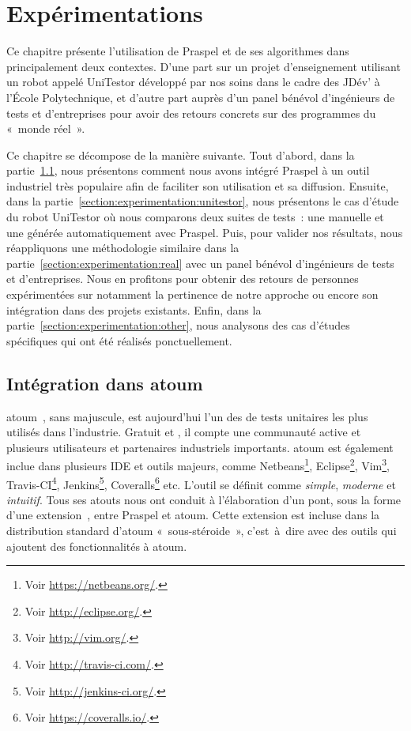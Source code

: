 \chapter{Expérimentations}
\label{chapter:experimentations}

\minitoc


Ce chapitre présente l'utilisation de Praspel et de ses algorithmes dans
principalement deux contextes. D'une part sur un projet d'enseignement utilisant
un robot appelé UniTestor développé par nos soins dans le cadre des JDév' à
l'École Polytechnique, et d'autre part auprès d'un panel bénévol d'ingénieurs de
tests et d'entreprises pour avoir des retours concrets sur des programmes du
«~monde réel~».

Ce chapitre se décompose de la manière suivante. Tout d'abord, dans la
partie~\ref{section:experimentation:atoum}, nous présentons comment nous avons
intégré Praspel à un outil industriel très populaire afin de faciliter son
utilisation et sa diffusion. Ensuite, dans la
partie~\ref{section:experimentation:unitestor}, nous présentons le cas d'étude
du robot UniTestor où nous comparons deux suites de tests~: une manuelle et une
générée automatiquement avec Praspel.  Puis, pour valider nos résultats, nous
réappliquons une méthodologie similaire dans la
partie~\ref{section:experimentation:real} avec un panel bénévol d'ingénieurs de
tests et d'entreprises. Nous en profitons pour obtenir des retours de personnes
expérimentées sur notamment la pertinence de notre approche ou encore son
intégration dans des projets existants. Enfin, dans la
partie~\ref{section:experimentation:other}, nous analysons des cas d'études
spécifiques qui ont été réalisés ponctuellement.

\section{Intégration dans atoum}
\label{section:experimentation:atoum}

atoum~, sans majuscule, est aujourd'hui l'un des
 de tests unitaires les plus utilisés dans l'industrie.
Gratuit et , il compte une communauté active et plusieurs
utilisateurs et partenaires industriels importants. atoum est également inclue
dans plusieurs IDE et outils majeurs, comme Netbeans\footnote{Voir
\url{https://netbeans.org/}.}, Eclipse\footnote{Voir
\url{http://eclipse.org/}.}, Vim\footnote{Voir \url{http://vim.org/}.},
Travis-CI\footnote{Voir \url{http://travis-ci.com/}.}, Jenkins\footnote{Voir
\url{http://jenkins-ci.org/}.}, Coveralls\footnote{Voir
\url{https://coveralls.io/}.} etc. L'outil se définit comme {\em simple}, {\em
moderne} et {\em intuitif}. Tous ses atouts nous ont conduit à l'élaboration
d'un pont, sous la forme d'une extension~, entre
Praspel et atoum.  Cette extension est incluse dans la distribution standard
d'atoum «~sous-stéroide~», c'est~à~dire avec des outils qui ajoutent des
fonctionnalités à atoum.

